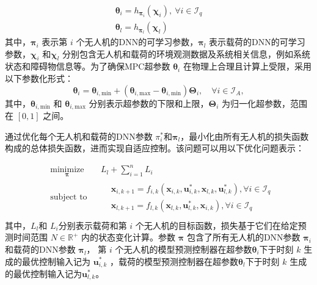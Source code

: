 \documentclass[lang=chs, degree=master, blindreview=true, winfonts=true]{yanputhesis}
\begin{document}
\begin{equation}
	\label{4}
	\begin{gathered}
		\boldsymbol{\theta}_i=h_{\boldsymbol{\pi}_i}\left(\boldsymbol{\chi}_i\right),\mathrm{~}\forall i\in\mathcal{I}_q\\    
		\boldsymbol{\theta}_l=h_{\boldsymbol{\pi}_l}\left(\boldsymbol{\chi}_l\right)
	\end{gathered}
\end{equation}
其中，\( \bm \pi_i \) 表示第 \(i\) 个无人机的DNN的可学习参数，\( \bm \pi_l \) 表示载荷的DNN的可学习参数，\( \bm \chi_i \) 和\( \bm \chi_l \) 分别包含无人机和载荷的环境观测数据及系统相关信息，例如系统状态和障碍物信息等。为了确保MPC超参数 \( \bm \theta_i \) 在物理上合理且计算上受限，采用以下参数化形式：
\begin{equation}
    \bm \theta_i = \bm \theta_{i,\text{min}} + \left( \bm \theta_{i,\text{max}} - \bm \theta_{i,\text{min}} \right) \bm \Theta_i, \quad \forall i \in \mathcal{I}_A,
\end{equation}
其中，\( \bm \theta_{i,\text{min}} \) 和 \( \bm \theta_{i,\text{max}} \) 分别表示超参数的下限和上限，\( \bm \Theta_i \) 为归一化超参数，范围在 \([\text{0}, \text{1}]\) 之间。

通过优化每个无人机和载荷的DNN参数 \( \pi_i^* \)和\(\bm \pi_l\)，最小化由所有无人机的损失函数构成的总体损失函数，进而实现自适应控制。该问题可以用以下优化问题表示：

\begin{equation}
	\begin{aligned} 
		&\operatorname*{minimize}_{\bm{\pi}} & & L_l+\sum_{i=1}^{n}L_i \\
		&\text{subject to} & & \begin{aligned}
			&\boldsymbol{x}_{i,{k+1}} = {{f}}_{i,k}\left(\boldsymbol{x}_{i,k}, \boldsymbol{u}^*_{i,{k}},  \boldsymbol{x}_{l,k}, \boldsymbol{u}^*_{l,{k}}\right), \forall i \in \mathcal{I}_q \\
			&\boldsymbol{x}_{l,{k+1}} = {{f}}_{l,k}\left(\boldsymbol{x}_{l,k}, \boldsymbol{u}^*_{{l},{k}},  \boldsymbol{x}_{i,k}\right), \forall i \in \mathcal{I}_q
		\end{aligned} \\
	\end{aligned}
\end{equation}
其中，$L_l $和 $L_i$分别表示载荷和第 \(i\) 个无人机的目标函数，损失基于它们在给定预测时间范围 \( N \in \mathbb{R}^+ \) 内的状态变化计算。参数 \(\bm \pi \) 包含了所有无人机的DNN参数 \( \bm \pi_i \)和载荷的DNN参数 \( \bm \pi_l \)，
第 \(i\) 个无人机的模型预测控制器在超参数\( \boldsymbol{\theta}_i \)下于时刻 \(k\) 生成的最优控制输入记为 \( \boldsymbol{u}^*_{i,{k}} \) ，载荷的模型预测控制器在超参数\( \boldsymbol{\theta}_l \)下于时刻 \(k\) 生成的最优控制输入记为\( \boldsymbol{u}^*_{l,{k}} \)。
\end{document}
